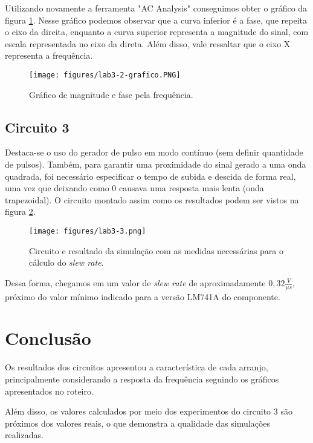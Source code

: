 \documentclass[a4paper]{report}
\begin{document}
Utilizando novamente a ferramenta "AC Analysis" conseguimos obter o gráfico da figura \ref{fig:figures-lab3-2-grafico-png}. Nesse gráfico podemos observar que a curva inferior é a fase, que repeita o eixo da direita, enquanto a curva superior representa a magnitude do sinal, com escala representada no eixo da direta. Além disso, vale ressaltar que o eixo X representa a frequência.

\begin{figure}[H]
    \centering
    \texttt{[image: figures/lab3-2-grafico.PNG]}
    \caption{Gráfico de magnitude e fase pela frequência.}
    \label{fig:figures-lab3-2-grafico-png}
\end{figure}




\subsection*{Circuito 3}

Destaca-se o uso do gerador de pulso em modo contínuo (sem definir quantidade de pulsos). Também, para garantir uma proximidade do sinal gerado a uma onda quadrada, foi necessário especificar o tempo de subida e descida de forma real, uma vez que deixando como 0 causava uma resposta mais lenta (onda trapezoidal). O circuito montado assim como os resultados podem ser vistos na figura \ref{fig:figures-lab3-3-png}.

\begin{figure}[H]
    \centering
    \texttt{[image: figures/lab3-3.png]}
    \caption{Circuito e resultado da simulação com as medidas necessárias para o cálculo do \emph{slew rate}.}
    \label{fig:figures-lab3-3-png}
\end{figure}

Dessa forma, chegamos em um valor de \emph{slew rate} de aproximadamente $0,32 \frac{V}{\mu s}$, próximo do valor mínimo indicado para a versão LM741A do componente.

\section*{Conclusão}

Os resultados dos circuitos apresentou a característica de cada arranjo, principalmente considerando a resposta da frequência seguindo os gráficos apresentados no roteiro.

Além disso, os valores calculados por meio dos experimentos do circuito 3 são próximos dos valores reais, o que demonstra a qualidade das simulações realizadas.
\end{document}
